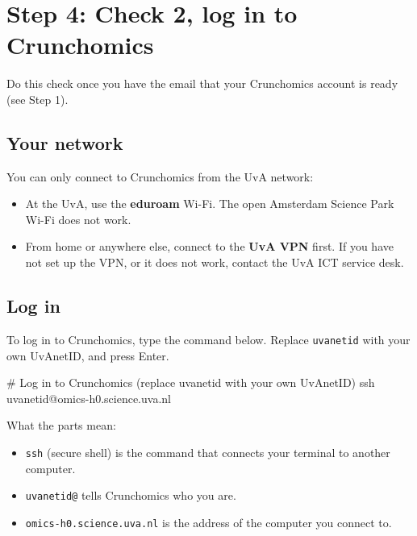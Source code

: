 \documentclass[
  letterpaper,
  DIV=11,
  numbers=noendperiod]{scrreprt}
\newenvironment{Shaded}{}{}
\newcommand{\CommentTok}[1]{\textcolor[rgb]{0.42,0.45,0.49}{#1}}
\newcommand{\FunctionTok}[1]{\textcolor[rgb]{0.44,0.26,0.76}{#1}}
\newcommand{\NormalTok}[1]{\textcolor[rgb]{0.14,0.16,0.18}{#1}}
\providecommand{\tightlist}{%
  \setlength{\itemsep}{0pt}\setlength{\parskip}{0pt}}
\begin{document}
\section{Step 4: Check 2, log in to
Crunchomics}\label{step-4-check-2-log-in-to-crunchomics}

Do this check once you have the email that your Crunchomics account is
ready (see Step 1).

\subsection{Your network}\label{your-network}

You can only connect to Crunchomics from the UvA network:

\begin{itemize}
\tightlist
\item
  At the UvA, use the \textbf{eduroam} Wi-Fi. The open Amsterdam Science
  Park Wi-Fi does not work.
\item
  From home or anywhere else, connect to the \textbf{UvA VPN} first. If
  you have not set up the VPN, or it does not work, contact the UvA ICT
  service desk.
\end{itemize}

\subsection{Log in}\label{log-in}

To log in to Crunchomics, type the command below. Replace
\texttt{uvanetid} with your own UvAnetID, and press Enter.

\begin{Shaded}
\begin{Highlighting}[]
\CommentTok{\# Log in to Crunchomics (replace uvanetid with your own UvAnetID)}
\FunctionTok{ssh}\NormalTok{ uvanetid@omics{-}h0.science.uva.nl}
\end{Highlighting}
\end{Shaded}

What the parts mean:

\begin{itemize}
\tightlist
\item
  \texttt{ssh} (secure shell) is the command that connects your terminal
  to another computer.
\item
  \texttt{uvanetid@} tells Crunchomics who you are.
\item
  \texttt{omics-h0.science.uva.nl} is the address of the computer you
  connect to.
\end{itemize}
\end{document}

